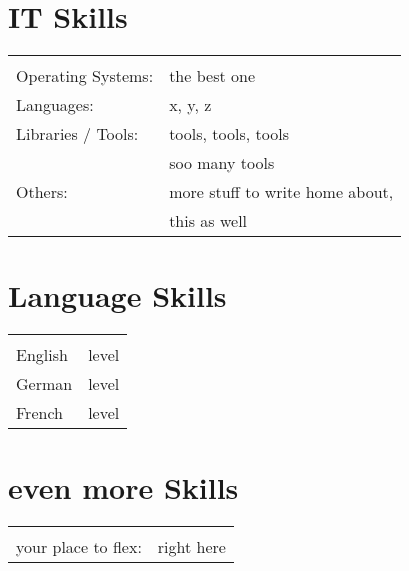 \documentclass[a4paper,12pt]{article}
\begin{document}
\begin{minipage}[t]{.6\textwidth}
\vspace{10pt}
\section*{IT Skills}
\begin{tabular}{ll}
    \vspace{-18pt}\hspace*{3cm}\\
    Operating Systems:
        & the best one \\
    Languages:
        & x, y, z \\
    Libraries / Tools:
        & tools, tools, tools \\
        & soo many tools \\
    Others:
        & more stuff to write home about, \\
        & this as well
\end{tabular}
\end{minipage}
\hfill
\begin{minipage}[t]{.325\textwidth}
\vspace{10pt}
\section*{Language Skills}
\begin{tabular}{ll}
    \vspace*{-18pt}\hspace*{2cm}\\
    English         & level\\
    German          & level\\
    French          & level
\end{tabular}
\end{minipage}


\section*{even more Skills}
\begin{tabular}{ll}
    \vspace{-12pt}\hspace*{3cm}\\
    your place to flex:
                    & right here \\
\end{tabular}




% 
\end{document}
